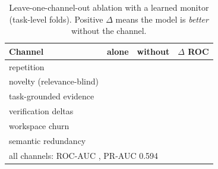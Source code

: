 
\begin{table}[t]\centering\small
\caption{Leave-one-channel-out ablation with a learned monitor (task-level folds). Positive $\Delta$ means
the model is \emph{better} without the channel.}
\label{tab:ablation}
\begin{tabular}{lrrr}\toprule
Channel & alone & without & $\Delta$ ROC \\ \midrule
repetition & \pablREPAucAlone{} & \pablREPAucWithout{} & \pablREPDelta{} \\
novelty (relevance-blind) & \pablNOVAucAlone{} & \pablNOVAucWithout{} & \pablNOVDelta{} \\
task-grounded evidence & \pablEVIDAucAlone{} & \pablEVIDAucWithout{} & \pablEVIDDelta{} \\
verification deltas & \pablVERAucAlone{} & \pablVERAucWithout{} & \pablVERDelta{} \\
workspace churn & \pablWORKAucAlone{} & \pablWORKAucWithout{} & \pablWORKDelta{} \\
semantic redundancy & \pablSEMAucAlone{} & \pablSEMAucWithout{} & \pablSEMDelta{} \\
\midrule
\multicolumn{4}{l}{all channels: ROC-AUC \pablFullAuc{}, PR-AUC 0.594} \\
\bottomrule\end{tabular}
\end{table}
